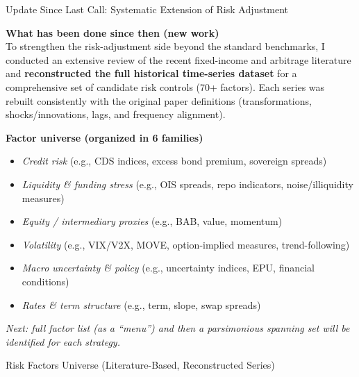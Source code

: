 \documentclass[aspectratio=169,11pt]{beamer}
\begin{document}
\begin{frame}[t]{Update Since Last Call: Systematic Extension of Risk Adjustment}
\small


\textbf{What has been done since then (new work)}\\
To strengthen the risk-adjustment side beyond the standard benchmarks, I conducted an extensive review of the recent fixed-income and arbitrage literature and \textbf{reconstructed the full historical time-series dataset} for a comprehensive set of candidate risk controls (70+ factors).  Each series was rebuilt consistently with the original paper definitions (transformations, shocks/innovations, lags, and frequency alignment).

\vspace{0.35cm}

\textbf{Factor universe (organized in 6 families)}\\[-0.05cm]
\begin{itemize}\itemsep=0.12cm
    \item \textit{Credit risk} (e.g., CDS indices, excess bond premium, sovereign spreads)
    \item \textit{Liquidity \& funding stress} (e.g., OIS spreads, repo indicators, noise/illiquidity measures)
    \item \textit{Equity / intermediary proxies} (e.g., BAB, value, momentum)
    \item \textit{Volatility} (e.g., VIX/V2X, MOVE, option-implied measures, trend-following)
    \item \textit{Macro uncertainty \& policy} (e.g., uncertainty indices, EPU, financial conditions)
    \item \textit{Rates \& term structure} (e.g., term, slope, swap spreads)
\end{itemize}

\vspace{0.15cm}
\footnotesize
\textit{Next: full factor list (as a “menu”) and then a parsimonious spanning set will be identified for each strategy.}

\end{frame}


\begin{frame}[t,allowframebreaks]{Risk Factors Universe (Literature-Based, Reconstructed Series)}

\end{frame}
\end{document}

